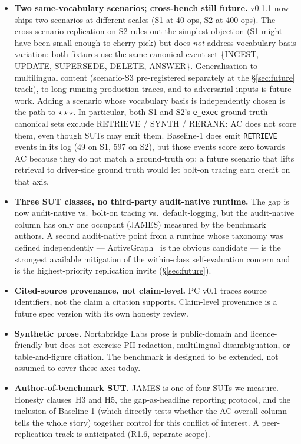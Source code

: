 \documentclass[11pt,a4paper]{article}
\begin{document}
\begin{itemize}[leftmargin=*]
  \item \textbf{Two same-vocabulary scenarios; cross-bench still future.} v0.1.1 now ships two scenarios at different scales (S1 at 40 ops, S2 at 400 ops). The cross-scenario replication on S2 rules out the simplest objection (S1 might have been small enough to cherry-pick) but does \emph{not} address vocabulary-basis variation: both fixtures use the same canonical event set \{INGEST, UPDATE, SUPERSEDE, DELETE, ANSWER\}. Generalisation to multilingual content (scenario-S3 pre-registered separately at the §\ref{sec:future} track), to long-running production traces, and to adversarial inputs is future work. Adding a scenario whose vocabulary basis is independently chosen is the path to $\star\star\star$. In particular, both S1 and S2's \texttt{e\_exec} ground-truth canonical sets exclude RETRIEVE / SYNTH / RERANK: AC does not score them, even though SUTs may emit them. Baseline-1 does emit \texttt{RETRIEVE} events in its log (49 on S1, 597 on S2), but those events score zero towards AC because they do not match a ground-truth op; a future scenario that lifts retrieval to driver-side ground truth would let bolt-on tracing earn credit on that axis.
  \item \textbf{Three SUT classes, no third-party audit-native runtime.} The gap is now audit-native vs.\ bolt-on tracing vs.\ default-logging, but the audit-native column has only one occupant (JAMES) measured by the benchmark authors. A second audit-native point from a runtime whose taxonomy was defined independently --- ActiveGraph~\cite{nakajima2026activegraph} is the obvious candidate --- is the strongest available mitigation of the within-class self-evaluation concern and is the highest-priority replication invite (§\ref{sec:future}).
  \item \textbf{Cited-source provenance, not claim-level.} PC v0.1 traces source identifiers, not the claim a citation supports. Claim-level provenance is a future spec version with its own honesty review.
  \item \textbf{Synthetic prose.} Northbridge Labs prose is public-domain and licence-friendly but does not exercise PII redaction, multilingual disambiguation, or table-and-figure citation. The benchmark is designed to be extended, not assumed to cover these axes today.
  \item \textbf{Author-of-benchmark SUT.} JAMES is one of four SUTs we measure. Honesty clauses~H3 and H5, the gap-as-headline reporting protocol, and the inclusion of Baseline-1 (which directly tests whether the AC-overall column tells the whole story) together control for this conflict of interest. A peer-replication track is anticipated (R1.6, separate scope).

\end{itemize}
\end{document}

